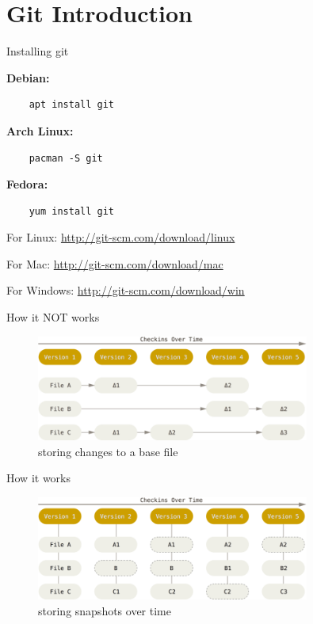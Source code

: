 \section{Git Introduction}

\begin{frame}[fragile]{Installing git}

    \textbf{Debian:}
    \begin{lstlisting}
    apt install git
    \end{lstlisting}

    \textbf{Arch Linux:}
    \begin{lstlisting}
    pacman -S git
    \end{lstlisting}

    \textbf{Fedora:}
    \begin{lstlisting}
    yum install git
    \end{lstlisting}

    \begin{description}
        \item{For Linux:} \url{http://git-scm.com/download/linux}
        \item{For Mac:} \url{http://git-scm.com/download/mac}
        \item{For Windows:} \url{http://git-scm.com/download/win}
    \end{description}

\end{frame}

\begin{frame}[fragile]{How it NOT works}
    \begin{figure}
        \centering
        \includegraphics[width=0.8\textwidth]{img/filebased.png}
        \caption{storing changes to a base file}
    \end{figure}
\end{frame}

\begin{frame}[fragile]{How it works}
    \begin{figure}
        \centering
        \includegraphics[width=0.8\textwidth]{img/snapshotbased.png}
        \caption{storing snapshots over time}
    \end{figure}
\end{frame}

